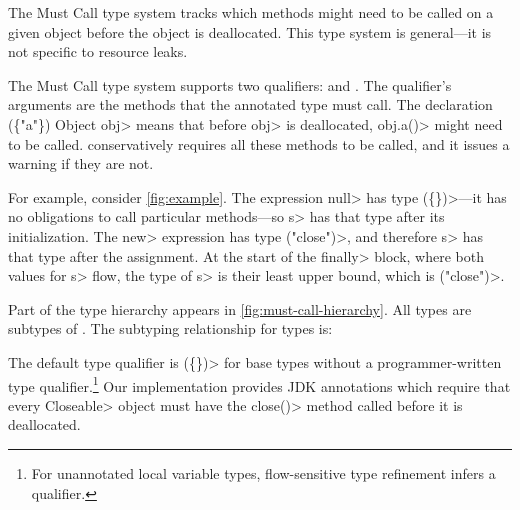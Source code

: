 The Must Call type system tracks
which methods might need to be called on
a given object before the object is deallocated.
This type system is general---it is not specific
to resource leaks.

The Must Call type system supports two qualifiers: \MustCall and
\MustCallUnknown. The \MustCall qualifier's arguments are the
methods that the annotated type must call. The declaration
\MustCall\<(\{"a"\}) Object obj> means that before \<obj> is
deallocated, \<obj.a()> might need to be called.
\Tool conservatively requires all these methods to be called,
and it issues a warning if they are not.

For example, consider \cref{fig:example}. The expression \<null> has type
\MustCall\<(\{\})>---it has no obligations
to call particular methods---so \<s> has that type after its initialization.
The \<new> expression has type \MustCall\<("close")>, and therefore
\<s> has that type after the assignment.
At the start of the \<finally> block, where both values for \<s> flow,
the type of \<s> is their least upper bound, which is \MustCall\<("close")>.


Part of the type hierarchy appears in \cref{fig:must-call-hierarchy}.
All types are subtypes of \MustCallUnknown.
The subtyping relationship for \MustCall types is:

The default type qualifier is \MustCall\<(\{\})> for base types without a
programmer-written type qualifier.\footnote{For unannotated local variable types,
  flow-sensitive type refinement infers a qualifier.}
Our implementation
provides JDK annotations which require that every 
\<Closeable> object must have the \<close()> method called before
it is deallocated.


